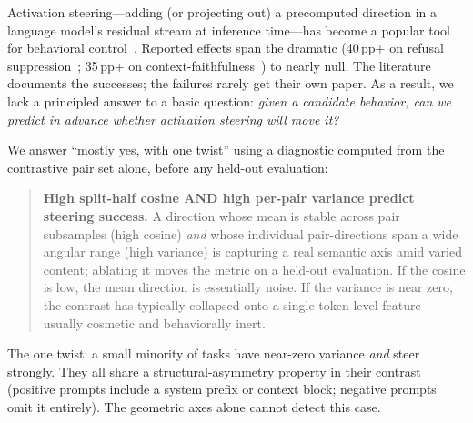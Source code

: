 \documentclass[11pt]{article}
\begin{document}
Activation steering---adding (or projecting out) a precomputed
direction in a language model's residual stream at inference
time---has become a popular tool for behavioral
control~\citep{turner2023activation,zou2023representation,
li2023iti,rimsky2023steering,arditi2024refusal,yang2026contextfocus}.
Reported effects span the dramatic (40\,pp+ on refusal
suppression~\citep{arditi2024refusal}; 35\,pp+ on
context-faithfulness~\citep{yang2026contextfocus}) to nearly null.
The literature documents the successes; the failures rarely get
their own paper. As a result, we lack a principled answer to a
basic question: \emph{given a candidate behavior, can we predict in
advance whether activation steering will move it?}

We answer ``mostly yes, with one twist'' using a diagnostic computed
from the contrastive pair set alone, before any held-out evaluation:

\begin{quote}
\textbf{High split-half cosine AND high per-pair variance predict
steering success.} A direction whose mean is stable across pair
subsamples (high cosine) \emph{and} whose individual pair-directions
span a wide angular range (high variance) is capturing a real
semantic axis amid varied content; ablating it moves the metric on a
held-out evaluation. If the cosine is low, the mean direction is
essentially noise. If the variance is near zero, the contrast has
typically collapsed onto a single token-level feature---usually
cosmetic and behaviorally inert.
\end{quote}

The one twist: a small minority of tasks have near-zero variance
\emph{and} steer strongly. They all share a structural-asymmetry
property in their contrast (positive prompts include a system
prefix or context block; negative prompts omit it entirely). The
geometric axes alone cannot detect this case.
\end{document}
